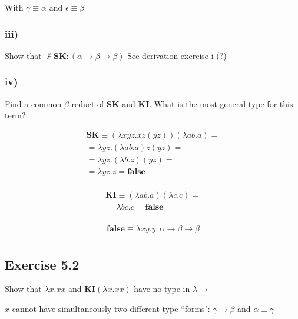 \documentclass[11pt]{article}
\begin{document}
With $\gamma \equiv \alpha$ and $\epsilon \equiv \beta$

\subsubsection*{iii)}
Show that $\not \vdash \mathbf{SK} : (\alpha \rightarrow \beta \rightarrow \beta)$
See derivation exercise i (?)

\subsubsection*{iv)}
Find a common $\beta$-reduct of $\mathbf{SK}$ and $\mathbf{KI}$. What is the most general type for this term?


\begin{gather*}
\mathbf{SK} \equiv (\lambda xyz. xz(yz)) (\lambda ab.a) = \\
= \lambda yz. (\lambda ab.a)z(yz) =  \\
= \lambda yz. (\lambda b.z) (yz) =  \\
= \lambda yz.z = \mathbf{false}  \\
\end{gather*}

\begin{gather*}
\mathbf{KI} \equiv (\lambda ab.a)(\lambda c.c) = \\
= \lambda bc.c = \mathbf{false} \\
\end{gather*}

\begin{gather*}
\mathbf{false} \equiv \lambda xy.y : \alpha \rightarrow \beta \rightarrow \beta \\
\end{gather*}

\subsection*{Exercise 5.2}
Show that $\lambda x.xx$ and $\mathbf{KI}(\lambda x.xx)$ have no type in $\lambda \rightarrow$

\begin{center}
 

\DP
\end{center}

$x$ cannot have simultaneously two different type ``forms": $\gamma \rightarrow \beta$ and $\alpha \equiv \gamma$
\end{document}
